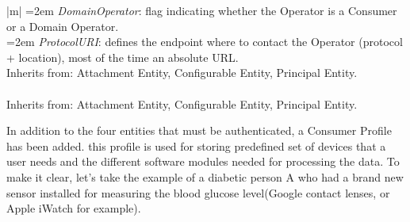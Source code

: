 \begin{longtable}{|m{\textwidth}|}
  	 \hspace{2em}\hangindent=2em \tabitem \textit{DomainOperator}: flag indicating whether the Operator is a Consumer or a Domain Operator.
  	\\
  	\hspace{2em}\hangindent=2em	\tabitem \textit{ProtocolURI}: defines the endpoint where to contact the Operator (protocol + location), most of the time an absolute URL. 
  	\\
  	Inherits from: Attachment Entity, Configurable Entity, Principal Entity. 
%  		
  	\\	\hline
  	\\
  	Inherits from: Attachment Entity, Configurable Entity, Principal Entity.
  	\\	\hline
  \end{longtable}
 
 \label{02_consumer_profile_example}
In addition to the four entities that must be authenticated, a Consumer Profile has been added. this profile is used for storing predefined set of devices that a user needs and the different software modules needed for processing the data. To make it clear, let's take the example of a diabetic person A who had a brand new sensor installed for measuring the blood glucose level(Google contact lenses, or Apple iWatch for example).


